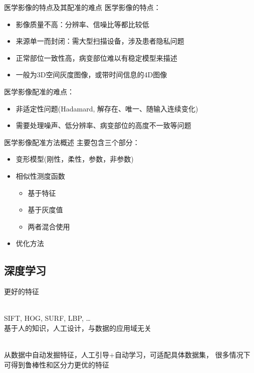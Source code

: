 \documentclass {beamer}
\begin{document}
\begin{frame}{医学影像的特点及其配准的难点}
    医学影像的\alert{特点}：
    \begin{itemize}
        \item 影像质量不高：分辨率、信噪比等都比较低
        \item 来源单一而封闭：需大型扫描设备，涉及患者隐私问题
        \item 正常部位一致性高，病变部位难以有稳定模型来描述
        \item 一般为3D空间灰度图像，或带时间信息的4D图像
    \end{itemize}
    \pause
    医学影像配准的\alert{难点}：
    \begin{itemize}
        \item 非适定性问题(Hadamard, 解存在、唯一、随输入连续变化)
        \item 需要处理噪声、低分辨率、病变部位的高度不一致等问题
    \end{itemize}
\end{frame}

\begin{frame}{医学影像配准方法概述}
    主要包含三个部分：
    \begin{itemize}
        \item 变形模型(刚性，柔性，参数，非参数)
        \item \alert<2>{相似性测度函数}
            \begin{itemize}
                \item \alert<2>{基于特征}
                \item 基于灰度值
                \item 两者混合使用
            \end{itemize}
        \item 优化方法
    \end{itemize}
\end{frame}

\subsection{深度学习}

\begin{frame}{更好的特征}
    \begin{description}
        \item<+->[传统特征] \hfill \\
            SIFT, HOG, SURF, LBP, \dots \\
            基于人的知识，人工设计，与数据的应用域无关
        \item<+->[深度学习] \hfill \\
            从数据中自动发掘特征，人工引导+自动学习，可适配具体数据集，
            很多情况下可得到鲁棒性和区分力更优的特征
    \end{description}
\end{frame}
\end{document}
